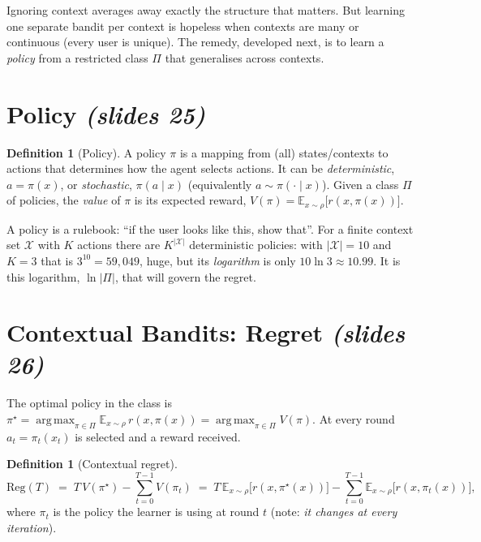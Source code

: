 \documentclass[11pt,a4paper]{article}
\newcommand{\E}{\mathbb{E}}
\newcommand{\calX}{\mathcal{X}}
\DeclareMathOperator*{\argmax}{arg\,max}
\newcommand{\slides}[1]{\emph{(slides #1)}}
\theoremstyle{plain}
\theoremstyle{definition}
\newtheorem{definition}[theorem]{Definition}
\theoremstyle{remark}
\begin{document}
\begin{intuition}
Ignoring context averages away exactly the structure that matters. But learning one separate bandit per context is hopeless when contexts are
many or continuous (every user is unique). The remedy, developed next, is to learn a \emph{policy} from a restricted class $\Pi$ that generalises across contexts.
\end{intuition}

\section{Policy \slides{25}}

\begin{definition}[Policy]\label{def:policy}
A policy $\pi$ is a mapping from (all) states/contexts to actions that determines how the agent selects actions. It can be
\emph{deterministic}, $a=\pi(x)$, or \emph{stochastic}, $\pi(a\mid x)$ (equivalently $a\sim\pi(\cdot\mid x)$). Given a class $\Pi$ of policies, the
\emph{value} of $\pi$ is its expected reward, $V(\pi)=\E_{x\sim\rho}\bigl[r(x,\pi(x))\bigr]$.
\end{definition}

\begin{intuition}
A policy is a rulebook: ``if the user looks like this, show that''. For a finite context set $\calX$ with $K$ actions there are $K^{|\calX|}$ deterministic policies:
with $|\calX|=10$ and $K=3$ that is $3^{10}=59{,}049$, huge, but its \emph{logarithm} is only $10\ln3\approx10.99$. It is this logarithm, $\ln|\Pi|$, that will govern the regret.
\end{intuition}

\section{Contextual Bandits: Regret \slides{26}}

The optimal policy in the class is $\pi^\star=\argmax_{\pi\in\Pi}\E_{x\sim\rho}\,r(x,\pi(x))=\argmax_{\pi\in\Pi}V(\pi)$.
At every round $a_t=\pi_t(x_t)$ is selected and a reward received.

\begin{definition}[Contextual regret]\label{def:reg}
\[
 \mathrm{Reg}(T)\;=\;T\,V(\pi^\star)-\sum_{t=0}^{T-1}V(\pi_t)
 \;=\;T\,\E_{x\sim\rho}\bigl[r(x,\pi^\star(x))\bigr]-\sum_{t=0}^{T-1}\E_{x\sim\rho}\bigl[r(x,\pi_t(x))\bigr],
\]
where $\pi_t$ is the policy the learner is using at round $t$ (note: \emph{it changes at every iteration}).
\end{definition}
\end{document}
